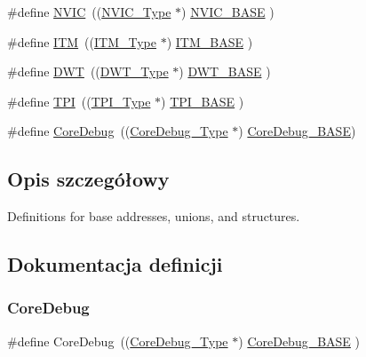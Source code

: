 \begin{DoxyCompactItemize}
\item 
\#define \hyperlink{group___c_m_s_i_s__core__base_gac8e97e8ce56ae9f57da1363a937f8a17}{N\+V\+IC}~((\hyperlink{struct_n_v_i_c___type}{N\+V\+I\+C\+\_\+\+Type}      $\ast$)     \hyperlink{group___c_m_s_i_s__core__base_gaa0288691785a5f868238e0468b39523d}{N\+V\+I\+C\+\_\+\+B\+A\+SE}     )
\item 
\#define \hyperlink{group___c_m_s_i_s__core__base_gabae7cdf882def602cb787bb039ff6a43}{I\+TM}~((\hyperlink{struct_i_t_m___type}{I\+T\+M\+\_\+\+Type}       $\ast$)     \hyperlink{group___c_m_s_i_s__core__base_gadd76251e412a195ec0a8f47227a8359e}{I\+T\+M\+\_\+\+B\+A\+SE}      )
\item 
\#define \hyperlink{group___c_m_s_i_s__core__base_gabbe5a060185e1d5afa3f85b14e10a6ce}{D\+WT}~((\hyperlink{struct_d_w_t___type}{D\+W\+T\+\_\+\+Type}       $\ast$)     \hyperlink{group___c_m_s_i_s__core__base_gafdab534f961bf8935eb456cb7700dcd2}{D\+W\+T\+\_\+\+B\+A\+SE}      )
\item 
\#define \hyperlink{group___c_m_s_i_s__core__base_ga8b4dd00016aed25a0ea54e9a9acd1239}{T\+PI}~((\hyperlink{struct_t_p_i___type}{T\+P\+I\+\_\+\+Type}       $\ast$)     \hyperlink{group___c_m_s_i_s__core__base_ga2b1eeff850a7e418844ca847145a1a68}{T\+P\+I\+\_\+\+B\+A\+SE}      )
\item 
\#define \hyperlink{group___c_m_s_i_s__core__base_gab6e30a2b802d9021619dbb0be7f5d63d}{Core\+Debug}~((\hyperlink{struct_core_debug___type}{Core\+Debug\+\_\+\+Type} $\ast$)     \hyperlink{group___c_m_s_i_s__core__base_ga680604dbcda9e9b31a1639fcffe5230b}{Core\+Debug\+\_\+\+B\+A\+SE})
\end{DoxyCompactItemize}


\subsection{Opis szczegółowy}
Definitions for base addresses, unions, and structures. 



\subsection{Dokumentacja definicji}
\mbox{\label{group___c_m_s_i_s__core__base_gab6e30a2b802d9021619dbb0be7f5d63d}} 
\subsubsection{\texorpdfstring{Core\+Debug}{CoreDebug}\hspace{0.1cm}{\footnotesize\ttfamily [1/8]}}
{\footnotesize\ttfamily \#define Core\+Debug~((\hyperlink{struct_core_debug___type}{Core\+Debug\+\_\+\+Type} $\ast$)     \hyperlink{group___c_m_s_i_s__core__base_ga680604dbcda9e9b31a1639fcffe5230b}{Core\+Debug\+\_\+\+B\+A\+SE}   )}

